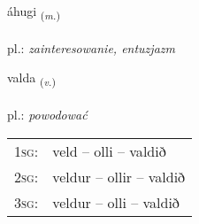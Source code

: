 \documentclass[frontgrid, backgrid]{flacards}\usepackage[]{graphicx}\usepackage[]{xcolor}
\begin{document}
\renewcommand{\flhead}{\vskip5pt \fboxsep=0pt {\small\bfseries\footnotesize Nafnorð | rzeczownik}}
\renewcommand{\fcfoot}{\vskip5pt \fboxsep=0pt \hspace{2pt}{\small\bfseries\footnotesize 1K}}

\renewcommand{\blhead}{\vskip5pt {\small\bfseries\footnotesize Nafnorð | rzeczownik }}
\renewcommand{\bcfoot}{\vskip5pt \hspace{2pt}{\small\bfseries\footnotesize 1K}}


{áhugi \small{\textsubscript{(\textit{m.})}} \\[1ex] %
\textphonetic{[auːhʏijɪ]} \\
pl.: \emph{zainteresowanie, entuzjazm} \\  [2ex]
\renewcommand*{\arraystretch}{0.8}
}

\renewcommand{\flhead}{\vskip5pt \fboxsep=0pt {\small\bfseries\footnotesize Sagnorð | czasownik}}
\renewcommand{\fcfoot}{\vskip5pt \fboxsep=0pt \hspace{2pt}{\small\bfseries\footnotesize 1K}}

\renewcommand{\blhead}{\vskip5pt {\small\bfseries\footnotesize Sagnorð | czasownik }}
\renewcommand{\bcfoot}{\vskip5pt \hspace{2pt}{\small\bfseries\footnotesize 1K}}


{valda \small{\textsubscript{(\textit{v.})}} \\[1ex] %
\textphonetic{[valta]} \\
pl.: \emph{powodować} \\  [2ex]
\renewcommand*{\arraystretch}{0.8}
\begin{tabular}{p{1cm}l}
\textsc{1sg}: & veld -- olli -- valdið \\ 
\textsc{2sg}: & veldur -- ollir -- valdið \\ 
\textsc{3sg}: & veldur -- olli -- valdið \\ 
\end{tabular}
}
\end{document}
